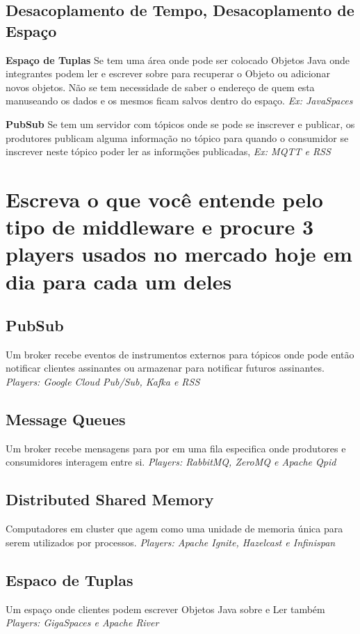 \documentclass[12pt]{article}
\begin{document}
\subsection{Desacoplamento de Tempo, Desacoplamento de Espaço}

\textbf{Espaço de Tuplas} Se tem uma área onde pode ser colocado Objetos Java onde
integrantes podem ler e escrever sobre para recuperar o Objeto ou adicionar novos
objetos. Não se tem necessidade de saber o endereço de quem esta manuseando os dados
e os mesmos ficam salvos dentro do espaço. \textit{Ex: JavaSpaces}

\noindent \textbf{PubSub}
Se tem um servidor com tópicos onde se pode se inscrever e publicar, os produtores
publicam alguma informação no tópico para quando o consumidor se inscrever neste
tópico poder ler as informções publicadas, \textit{Ex: MQTT e RSS}

\section{
Escreva o que você entende pelo tipo de middleware e procure 3 players usados no mercado hoje em dia para cada um deles}

\subsection{PubSub}
Um broker recebe eventos de instrumentos externos para tópicos onde pode então
notificar clientes assinantes ou armazenar para notificar futuros assinantes.
\textit{Players: Google Cloud Pub/Sub, Kafka e RSS}

\subsection{Message Queues}
Um broker recebe mensagens para por em uma fila especifica onde produtores
e consumidores interagem entre si.
\textit{Players: RabbitMQ, ZeroMQ e Apache Qpid}

\subsection{Distributed Shared Memory}
Computadores em cluster que agem como uma unidade de memoria única para serem
utilizados por processos.
\textit{Players: Apache Ignite, Hazelcast e Infinispan}

\subsection{Espaco de Tuplas}
Um espaço onde clientes podem escrever Objetos Java sobre e Ler também
\textit{Players: GigaSpaces e Apache River}
\end{document}
